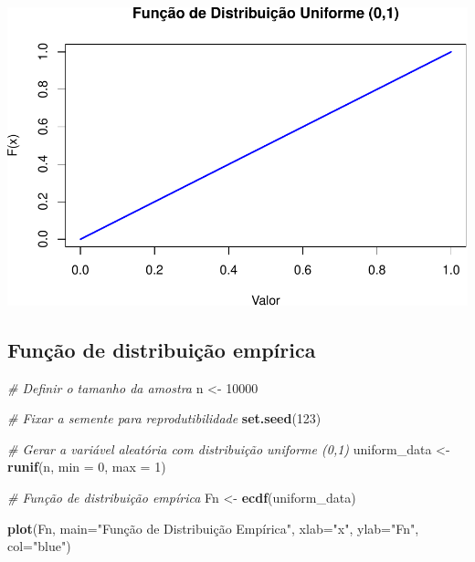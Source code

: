 \documentclass[
]{book}
\newenvironment{Shaded}{\begin{snugshade}}{\end{snugshade}}
\newcommand{\AttributeTok}[1]{\textcolor[rgb]{0.13,0.29,0.53}{#1}}
\newcommand{\CommentTok}[1]{\textcolor[rgb]{0.56,0.35,0.01}{\textit{#1}}}
\newcommand{\DecValTok}[1]{\textcolor[rgb]{0.00,0.00,0.81}{#1}}
\newcommand{\FunctionTok}[1]{\textcolor[rgb]{0.13,0.29,0.53}{\textbf{#1}}}
\newcommand{\NormalTok}[1]{#1}
\newcommand{\OtherTok}[1]{\textcolor[rgb]{0.56,0.35,0.01}{#1}}
\newcommand{\StringTok}[1]{\textcolor[rgb]{0.31,0.60,0.02}{#1}}
\theoremstyle{definition}
\theoremstyle{definition}
\theoremstyle{definition}
\theoremstyle{definition}
\theoremstyle{remark}
\begin{document}
\includegraphics{meuLivro2_files/figure-latex/unnamed-chunk-121-1.pdf}

\subsection{Função de distribuição empírica}\label{funuxe7uxe3o-de-distribuiuxe7uxe3o-empuxedrica-3}

\begin{Shaded}
\begin{Highlighting}[]
\CommentTok{\# Definir o tamanho da amostra}
\NormalTok{n }\OtherTok{\textless{}{-}} \DecValTok{10000}

\CommentTok{\# Fixar a semente para reprodutibilidade}
\FunctionTok{set.seed}\NormalTok{(}\DecValTok{123}\NormalTok{)}

\CommentTok{\# Gerar a variável aleatória com distribuição uniforme (0,1)}
\NormalTok{uniform\_data }\OtherTok{\textless{}{-}} \FunctionTok{runif}\NormalTok{(n, }\AttributeTok{min =} \DecValTok{0}\NormalTok{, }\AttributeTok{max =} \DecValTok{1}\NormalTok{)}

\CommentTok{\# Função de distribuição empírica}
\NormalTok{Fn }\OtherTok{\textless{}{-}} \FunctionTok{ecdf}\NormalTok{(uniform\_data)}

\FunctionTok{plot}\NormalTok{(Fn, }\AttributeTok{main=}\StringTok{"Função de Distribuição Empírica"}\NormalTok{,}
     \AttributeTok{xlab=}\StringTok{"x"}\NormalTok{,}
     \AttributeTok{ylab=}\StringTok{"Fn"}\NormalTok{,}
     \AttributeTok{col=}\StringTok{"blue"}\NormalTok{)}
\end{Highlighting}
\end{Shaded}
\end{document}
